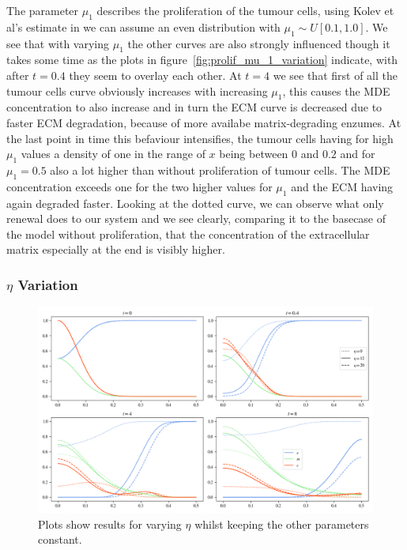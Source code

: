 The parameter $\mu_1$ describes the proliferation of the tumour cells, using Kolev et al's estimate in \cite{Kolev2010} we can assume an even distribution with $\mu_1 \sim U[0.1, 1.0]$. We see that with varying $\mu_1$ the other curves are also strongly influenced though it takes some time as the plots in figure~\ref{fig:prolif_mu_1_variation} indicate, with after $t=0.4$ they seem to overlay each other. At $t=4$ we see that first of all the tumour cells curve obviously increases with increasing $\mu_1$, this causes the MDE concentration to also increase and in turn the ECM curve is decreased due to faster ECM degradation, because of more availabe matrix-degrading enzumes. At the last point in time this befaviour intensifies, the tumour cells having for high $\mu_1$ values a density of one in the range of $x$ being between $0$ and $0.2$ and for $\mu_1=0.5$ also a lot higher than without proliferation of tumour cells. The MDE concentration exceeds one for the two higher values for $\mu_1$ and the ECM having again degraded faster. Looking at the dotted curve, we can observe what only renewal does to our system and we see clearly, comparing it to the basecase of the model without proliferation, that the concentration of the extracellular matrix especially at the end is visibly higher.



\subsubsection*{$\eta$ Variation}
\begin{figure}[h]
    \centering
    \includegraphics[width=\textwidth]{resources/images/prolif_eta_variation.png}
    \caption{Plots show results for varying $\eta$ whilst keeping the other parameters constant.}
    \label{fig:prolif_eta_variation}
\end{figure}


